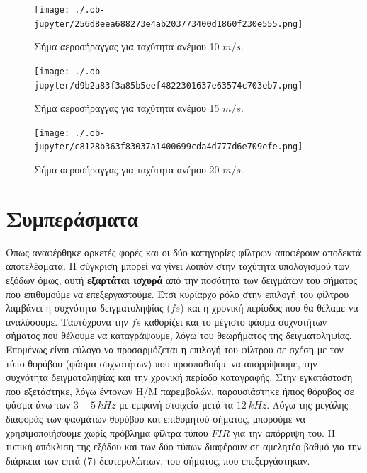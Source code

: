 \documentclass[breaklines=true, 12pt]{article}
\begin{document}
\begin{figure}[htbp]
\centering
\texttt{[image: ./.ob-jupyter/256d8eea688273e4ab203773400d1860f230e555.png]}
\caption{\label{ii1_w10}Σήμα αεροσήραγγας για ταχύτητα ανέμου 10 \(m/s\).}
\end{figure}

\begin{figure}[htbp]
\centering
\texttt{[image: ./.ob-jupyter/d9b2a83f3a85b5eef4822301637e63574c703eb7.png]}
\caption{\label{ii1_w15}Σήμα αεροσήραγγας για ταχύτητα ανέμου 15 \(m/s\).}
\end{figure}

\begin{figure}[htbp]
\centering
\texttt{[image: ./.ob-jupyter/c8128b363f83037a1400699cda4d777d6e709efe.png]}
\caption{\label{ii1_w20}Σήμα αεροσήραγγας για ταχύτητα ανέμου 20 \(m/s\).}
\end{figure}
\clearpage
\section{Συμπεράσματα}
\label{sec:orgb7e83be}
Όπως αναφέρθηκε αρκετές φορές και οι δύο κατηγορίες φίλτρων αποφέρουν αποδεκτά
αποτελέσματα. Η σύγκριση μπορεί να γίνει λοιπόν στην ταχύτητα
υπολογισμού των εξόδων όμως, αυτή \textbf{εξαρτάται ισχυρά} από την ποσότητα των
δειγμάτων του σήματος που επιθυμούμε να επεξεργαστούμε. Έτσι κυρίαρχο
ρόλο στην επιλογή του φίλτρου λαμβάνει η συχνότητα δειγματοληψίας (\(fs\)) και η
χρονική περίοδος που θα θέλαμε να αναλύσουμε. Ταυτόχρονα την \(fs\) καθορίζει
και το μέγιστο φάσμα συχνοτήτων σήματος που θέλουμε να καταγράψουμε, λόγω του
θεωρήματος της δειγματοληψίας. Επομένως είναι εύλογο να προσαρμόζεται η
επιλογή του φίλτρου σε σχέση με τον τύπο θορύβου (φάσμα συχνοτήτων)
που προσπαθούμε να απορρίψουμε, την συχνότητα δειγματοληψίας και την χρονική
περίοδο καταγραφής. Στην εγκατάσταση που εξετάστηκε, λόγω έντονων Η/Μ
παρεμβολών, παρουσιάστηκε ήπιος θόρυβος σε φάσμα άνω των \(3-5\ kHz\) με εμφανή
στοιχεία μετά τα \(12\ kHz\). Λόγω της μεγάλης διαφοράς των φασμάτων θορύβου και
επιθυμητού σήματος, μπορούμε να χρησιμοποιήσουμε χωρίς πρόβλημα φίλτρα τύπου
\(FIR\) για την απόρριψη του. Η τυπική απόκλιση της εξόδου και των δύο τύπων
διαφέρουν σε αμελητέο βαθμό για την διάρκεια των επτά (7) δευτερολέπτων, του
σήματος, που επεξεργάστηκαν.
\end{document}
